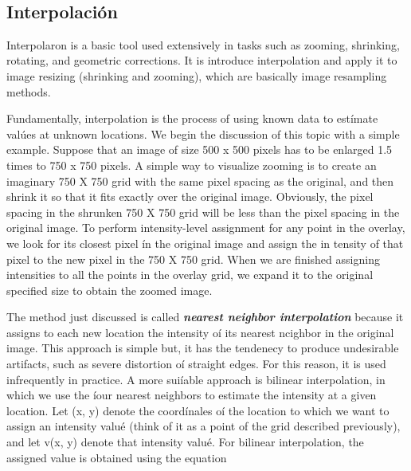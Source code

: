 \documentclass[letterpaper,14pts]{article}
\begin{document}
    \begin{center}
    \end{center}
    { \hspace*{\fill} \\}
    
    \subsection{Interpolación}\label{interpolaciuxf3n}

Interpolaron is a basic tool used extensively in tasks such as zooming,
shrinking, rotating, and geometric corrections. It is introduce
interpolation and apply it to image resizing (shrinking and zooming),
which are basically image resampling methods.

Fundamentally, interpolation is the process of using known data to
estímate valúes at unknown locations. We begin the discussion of this
topic with a simple example. Suppose that an image of size 500 x 500
pixels has to be enlarged 1.5 times to 750 x 750 pixels. A simple way to
visualize zooming is to create an imaginary 750 X 750 grid with the same
pixel spacing as the original, and then shrink it so that it fits
exactly over the original image. Obviously, the pixel spacing in the
shrunken 750 X 750 grid will be less than the pixel spacing in the
original image. To perform intensity-level assignment for any point in
the overlay, we look for its closest pixel ín the original image and
assign the in tensity of that pixel to the new pixel in the 750 X 750
grid. When we are finished assigning intensities to all the points in
the overlay grid, we expand it to the original specified size to obtain
the zoomed image.

The method just discussed is called \textbf{\emph{nearest neighbor
interpolation}} because it assigns to each new location the intensity oí
its nearest ncighbor in the original image. This approach is simple but,
it has the tendenecy to produce undesirable artifacts, such as severe
distortion oí straight edges. For this reason, it is used infrequently
in practice. A more suiíable approach is bilinear interpolation, in
which we use the íour nearest neighbors to estimate the intensity at a
given location. Let (x, y) denote the coordínales oí the location to
which we want to assign an intensity valué (think of it as a point of
the grid described previously), and let v(x, y) denote that intensity
valué. For bilinear interpolation, the assigned value is obtained using
the equation
\end{document}
